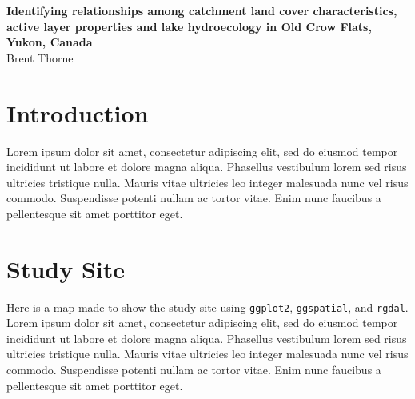 \documentclass[article,30pt,extrafontsizes]{memoir}
\begin{document}
\begin{shaded}
\begingroup
  \centering
  \huge\textbf{Identifying relationships among catchment land cover characteristics,
active layer properties and lake hydroecology in Old Crow Flats, Yukon,
Canada}\\[0.3in]
  \large Brent Thorne\par
\endgroup
\vspace{1.2in}
  \end{shaded}
\begin{multicols*}{3}
\small{\noindent
\section{Introduction}\label{introduction}

Lorem ipsum dolor sit amet, \autocite{holden_identifying_2012}
consectetur adipiscing elit, sed do eiusmod tempor incididunt ut labore
et dolore magna aliqua. Phasellus vestibulum lorem sed risus ultricies
tristique nulla. Mauris vitae ultricies leo integer malesuada nunc vel
risus commodo. Suspendisse potenti nullam ac tortor vitae. Enim nunc
faucibus a pellentesque sit amet porttitor eget.

\section{Study Site}\label{study-site}

Here is a map made to show the study site using \texttt{ggplot2},
\texttt{ggspatial}, and \texttt{rgdal}. Lorem ipsum dolor sit amet,
\autocite{middleton_geological_nodate} consectetur adipiscing elit, sed
do eiusmod tempor incididunt ut labore et dolore magna aliqua. Phasellus
vestibulum lorem sed risus ultricies tristique nulla. Mauris vitae
ultricies leo integer malesuada nunc vel risus commodo. Suspendisse
potenti nullam ac tortor vitae. Enim nunc faucibus a pellentesque sit
amet porttitor eget.

\begin{figure}


\end{figure}}
\end{multicols*}
\end{document}
